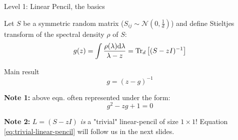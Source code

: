\documentclass[10pt]{beamer}
\begin{document}
\begin{frame}{Level 1: Linear Pencil, the basics}

  Let $S$ be a symmetric random matrix ($S_{ij} \sim \mathcal N(0, \frac{1}{d})$) and define Stieltjes transform of the spectral density $\rho$ of $S$:
  $$ g(z) = \int \frac{\rho(\lambda) \dd \lambda}{\lambda - z} = \traceLim[d]{ (S - zI)^{-1}}$$

  \begin{block}{Main result \cite{wigner1958distribution}}
    \begin{equation}\label{eq:trivial-linear-pencil}
        g = (z-g)^{-1}
    \end{equation}
  \end{block}

  \textbf{Note 1:} above eqn. often represented under the form:
  $$g^2 - zg + 1 = 0$$

  \textbf{Note 2:} 
  $L=(S-zI)$ \emph{is} a "trivial" linear-pencil of size $1 \times 1$! 
  Equation \eqref{eq:trivial-linear-pencil} will follow us in the next slides.

\end{frame}
\end{document}

